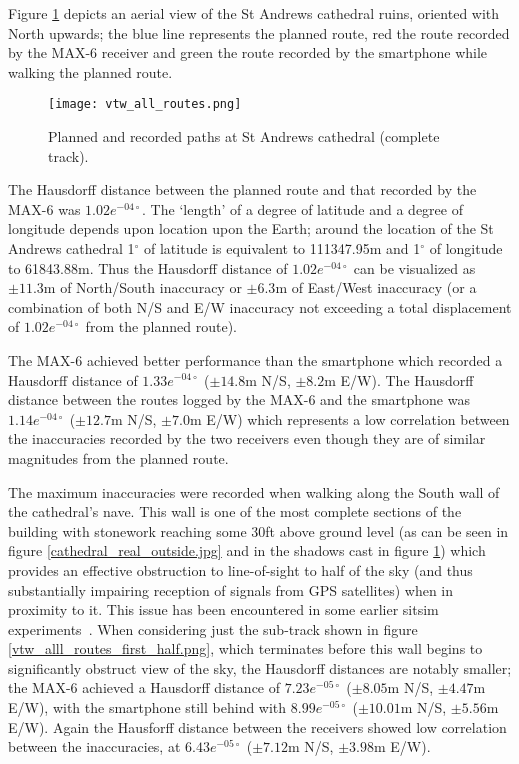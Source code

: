 Figure \ref{vtw_all_routes.png} depicts an aerial view of the St Andrews cathedral ruins, oriented with North upwards; the blue line represents the planned route, red the route recorded by the MAX-6 receiver and green the route recorded by the smartphone while walking the planned route.

\begin{figure}[h]
\centering
\texttt{[image: vtw\_all\_routes.png]}
\caption{Planned and recorded paths at St Andrews cathedral (complete track).}
\label{vtw_all_routes.png}
\end{figure}

The Hausdorff distance between the planned route and that recorded by the MAX-6 was $1.02e^{-04\circ}$. The `length' of a degree of latitude and a degree of longitude depends upon location upon the Earth; around the location of the St Andrews cathedral 1$^\circ$ of latitude is equivalent to 111347.95m and 1$^\circ$ of longitude to 61843.88m. Thus the Hausdorff distance of $1.02e^{-04\circ}$ can be visualized as $\pm11.3$m of North/South inaccuracy or $\pm6.3$m of East/West inaccuracy (or a combination of both N/S and E/W inaccuracy not exceeding a total displacement of $1.02e^{-04\circ}$ from the planned route).

The MAX-6 achieved better performance than the smartphone which recorded a Hausdorff distance of $1.33e^{-04\circ}$ ($\pm14.8$m N/S, $\pm8.2$m E/W). The Hausdorff distance between the routes logged by the MAX-6 and the smartphone was $1.14e^{-04\circ}$ ($\pm12.7$m N/S, $\pm7.0$m E/W) which represents a low correlation between the inaccuracies recorded by the two receivers even though they are of similar magnitudes from the planned route.

The maximum inaccuracies were recorded when walking along the South wall of the cathedral's nave. This wall is one of the most complete sections of the building with stonework reaching some 30ft above ground level (as can be seen in figure \ref{cathedral_real_outside.jpg} and in the shadows cast in figure \ref{vtw_all_routes.png}) which provides an effective obstruction to line-of-sight to half of the sky (and thus substantially impairing reception of signals from GPS satellites) when in proximity to it. This issue has been encountered in some earlier sitsim experiments~\cite{Liestøl2014}. When considering just the sub-track shown in figure \ref{vtw_alll_routes_first_half.png}, which terminates before this wall begins to significantly obstruct view of the sky, the Hausdorff distances are notably smaller; the MAX-6 achieved a Hausdorff distance of $7.23e^{-05\circ}$ ($\pm8.05$m N/S, $\pm4.47$m E/W), with the smartphone still behind with $8.99e^{-05\circ}$ ($\pm10.01$m N/S, $\pm5.56$m E/W). Again the Hausforff distance between the receivers showed low correlation between the inaccuracies, at $6.43e^{-05\circ}$ ($\pm7.12$m N/S, $\pm3.98$m E/W).
 
